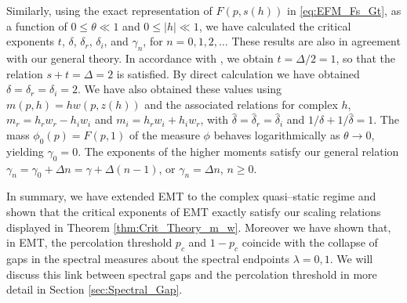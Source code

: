 \documentclass[english,12pt,jmp,graphicx]{revtex4-1}
\newcommand{\dha}{\hat{\delta}}
\begin{document}
Similarly, using the exact representation of $F(p,s(h))$ in \eqref{eq:EFM_Fs_Gt},
as a function of $0\leq\theta\ll1$ and $0\leq|h|\ll1$, we have calculated the
critical exponents $t$, $\delta$, $\delta_r$,
$\delta_i$, and $\gamma_n$, for $n=0,1,2,\ldots$ These results are also in agreement
with our general theory. In accordance with \cite{Day:JPCM-96}, we
obtain $t=\Delta/2=1$, so that the relation $s+t=\Delta=2$ is
satisfied. By direct calculation we have obtained $\delta=\delta_r=\delta_i=2$. We
have also obtained these values using $m(p,h)=hw(p,z(h))$ and the
associated relations for complex $h$, $m_r=h_rw_r-h_iw_i$ and
$m_i=h_rw_i+h_iw_r$, with $\dha=\dha_r=\dha_i$ and $1/\delta+1/\dha=1$.
The mass $\phi_0(p)=F(p,1)$ of the measure $\phi$ behaves
logarithmically as $\theta\to0$, yielding $\gamma_0=0$. The exponents of
the higher moments satisfy our general relation
$\gamma_n=\gamma_0+\Delta n=\gamma+\Delta(n-1)$, or $\gamma_n=\Delta n$, $n\geq0$.

In summary, we have extended EMT to the complex quasi--static regime
and shown that the critical exponents of EMT exactly satisfy our
scaling relations displayed in Theorem
\ref{thm:Crit_Theory_m_w}. Moreover we have shown that, in EMT, the
percolation threshold $p_c$ and $1-p_c$ coincide with the collapse of
gaps in the spectral measures about the spectral endpoints $\lambda=0,1$. We  
will discuss this link between spectral gaps and the percolation
threshold in more detail in Section \ref{sec:Spectral_Gap}.
%
\end{document}
